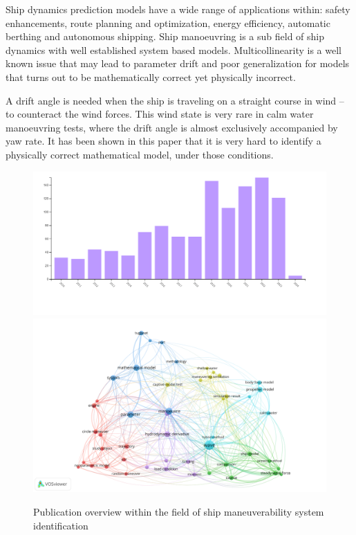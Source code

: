 Ship dynamics prediction models have a wide range of applications within: safety enhancements, route planning and optimization, energy efficiency, automatic berthing and autonomous shipping.
Ship manoeuvring is a sub field of ship dynamics with well established system based models.
Multicollinearity is a well known issue that may lead to parameter drift and poor generalization for models that turns out to be  mathematically correct yet physically incorrect.

A drift angle is needed when the ship is traveling on a straight course in wind -- to counteract the wind forces. This wind state is very rare in calm water manoeuvring tests, where the drift angle is almost exclusively accompanied by yaw rate. It has been shown in this paper that it is very hard to identify a physically correct mathematical model, under those conditions.


\begin{figure}[h!]
  \includegraphics[width=.45\textwidth]{figures/trendinyear.jpg}
  \includegraphics[width=.45\textwidth]{figures/kewords23.png}
  \caption{Publication overview within the field of ship maneuverability system identification}
  \label{fig:pub_overview}
\end{figure}

